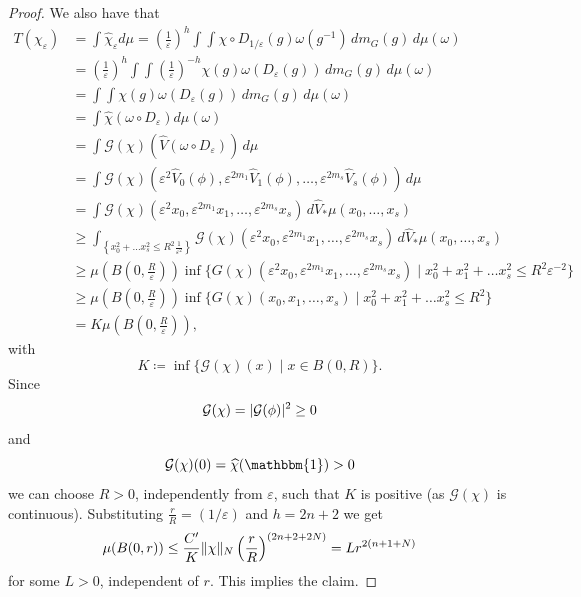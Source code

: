 \documentclass[12pt,reqno,a4paper]{amsart}
\theoremstyle{theorem}
\theoremstyle{definition}
\numberwithin{theorem}{section}
\numberwithin{equation}{section}
\renewcommand{\epsilon}{\varepsilon}
\DeclarePairedDelimiter{\norm}{\lVert}{\rVert}
\DeclarePairedDelimiter{\abs}{\lvert}{\rvert}
\begin{document}
\begin{proof}
	We also have that
	\begin{align*}
		T(\chi_\epsilon) &= \int \widehat{\chi}_\varepsilon d\mu
		= \left(\frac{1}{\epsilon}\right)^h \int \int \chi\circ D_{1/\epsilon}(g)\omega(g^{-1})\,dm_G(g)\,d\mu(\omega)\\
		&= \left(\frac{1}{\epsilon}\right)^h\int \int \left(\frac{1}{\epsilon}\right)^{-h}\chi(g)\omega(D_{\epsilon}(g))\,dm_G(g)\,d\mu(\omega)\\
		&= \int \int \chi(g)\omega(D_{\epsilon}(g))\,dm_G(g)\,d\mu(\omega)\\
		&= \int \widehat{\chi}(\omega\circ D_{\epsilon})d\mu(\omega)\\
		&= \int \mathcal{G}(\chi)(\widehat{V}(\omega\circ D_{\epsilon}))\, d\mu\\
		&= \int \mathcal{G}(\chi)(\epsilon^2\widehat{V}_0(\phi),\epsilon^{2m_1}\widehat{V}_1(\phi),\dots, \epsilon^{2m_s}\widehat{V}_s(\phi))\, d\mu\\
		&= \int \mathcal{G}(\chi)(\epsilon^2x_0,\epsilon^{2m_1}x_1,\dots, \epsilon^{2m_s}x_s)\, d\widehat{V}_*\mu(x_0,\dots, x_s)\\
		&\geq \int_{\left\{x_0^2+\dots x_s^2\leq R^2\frac{1}{\epsilon^2}\right\}} \mathcal{G}(\chi)(\epsilon^2x_0,\epsilon^{2m_1}x_1,\dots, \epsilon^{2m_s}x_s)\, d\widehat{V}_*\mu(x_0,\dots, x_s)\\
		&\geq \mu\left(B\left(0, \frac{R}{\epsilon}\right)\right)\inf\{G(\chi)(\varepsilon^2x_0,\varepsilon^{2m_1}x_1,\dots, \varepsilon^{2m_s}x_s)\mid x_0^2+x_1^2+\dots x_s^2\leq R^2\epsilon^{-2}\}\\
		&\geq \mu\left(B\left(0, \frac{R}{\epsilon}\right)\right) \inf\{G(\chi)(x_0,x_1,\dots, x_s)\mid x_0^2+x_1^2+\dots x_s^2\leq R^2\}\\
		&= K\mu\left(B\left(0, \frac{R}{\epsilon}\right)\right),
	\end{align*}
	with
	\[
	K \coloneqq \inf\{\mathcal{G}(\chi)(x)\mid x\in B(0,R)\}.
	\]
	Since 
	\[
	\mathcal{G}(\chi) = \abs{\mathcal{G}(\phi)}^2 \geq 0
	\]
	and 
	\[
	\mathcal{G}(\chi)(0) = \widehat{\chi}(\mathbbm{1})>0
	\]
	we can choose $R>0$, independently from $\epsilon$, such that $K$ is positive (as $\mathcal{G}(\chi)$ is continuous).
	Substituting $\frac{r}{R}=(1/\epsilon)$ and $h=2n+2$ we get
	\[
	\mu(B(0, r))\leq \frac{C'}{K}\norm{\chi}_N\left(\frac{r}{R}\right)^{(2n+2+2N)} = L r^{2(n+1+N)}
	\]
	for some $L>0$, independent of $r$. This implies the claim.
\end{proof}
\end{document}
